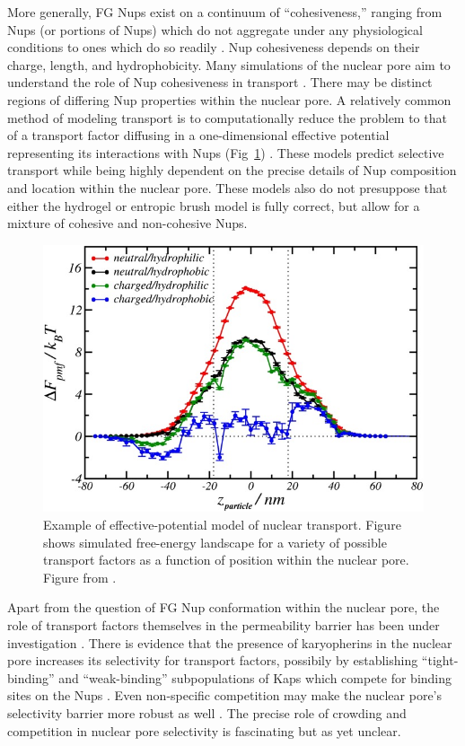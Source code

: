 More generally, FG Nups exist on a continuum of ``cohesiveness,'' ranging from Nups (or portions of Nups) which do not aggregate under any physiological conditions to ones which do so readily \cite{hough15}.  Nup cohesiveness depends on their charge, length, and hydrophobicity.  Many simulations of the nuclear pore aim to understand the role of Nup cohesiveness in transport \cite{gu19,tagliazucchi13,nasrabad16,mincer11}.  There may be distinct regions of differing Nup properties within the nuclear pore.  A relatively common method of modeling transport is to computationally reduce the problem to that of a transport factor diffusing in a one-dimensional effective potential representing its interactions with Nups (Fig~\ref{fig:effective-potential}) \cite{tagliazucchi13, zilman07,tu13, timney16}.  These models predict selective transport while being highly dependent on the precise details of Nup composition and location within the nuclear pore.  These models also do not presuppose that either the hydrogel or entropic brush model is fully correct, but allow for a mixture of cohesive and non-cohesive Nups.

\begin{figure}
\centering
\includegraphics[width=0.5\linewidth]{figs/ch01/tagliazucchi}
\caption[Effective potential model of nuclear transport.]{Example of effective-potential model of nuclear transport.  Figure shows simulated free-energy landscape for a variety of possible transport factors as a function of position within the nuclear pore. Figure from \cite{tagliazucchi13}.\\}
\label{fig:effective-potential}
\end{figure}

Apart from the question of FG Nup conformation within the nuclear pore, the role of transport factors themselves in the permeability barrier has been under investigation \cite{kapinos18,kapinos17,schleicher14,kapinos14}.  There is evidence that the presence of karyopherins in the nuclear pore increases its selectivity for transport factors, possibily by establishing ``tight-binding'' and ``weak-binding'' subpopulations of Kaps which compete for binding sites on the Nups \cite{wagner15}.  Even non-specific competition may make the nuclear pore's selectivity barrier more robust as well \cite{tetenbaum-novatt12,zilman09,zilman10,timney06}.  The precise role of crowding and competition in nuclear pore selectivity is fascinating but as yet unclear.

